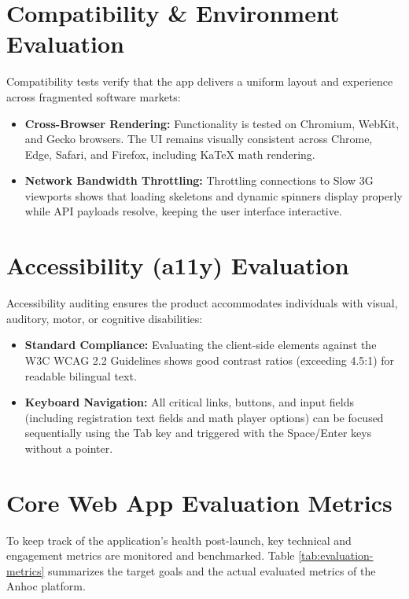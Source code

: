 \section{Compatibility \& Environment Evaluation}

Compatibility tests verify that the app delivers a uniform layout and experience across fragmented software markets:
\begin{itemize}
  \item \textbf{Cross-Browser Rendering:} Functionality is tested on Chromium, WebKit, and Gecko browsers. The UI remains visually consistent across Chrome, Edge, Safari, and Firefox, including KaTeX math rendering.
  \item \textbf{Network Bandwidth Throttling:} Throttling connections to Slow 3G viewports shows that loading skeletons and dynamic spinners display properly while API payloads resolve, keeping the user interface interactive.
\end{itemize}

\section{Accessibility (a11y) Evaluation}

Accessibility auditing ensures the product accommodates individuals with visual, auditory, motor, or cognitive disabilities:
\begin{itemize}
  \item \textbf{Standard Compliance:} Evaluating the client-side elements against the W3C WCAG 2.2 Guidelines shows good contrast ratios (exceeding 4.5:1) for readable bilingual text.
  \item \textbf{Keyboard Navigation:} All critical links, buttons, and input fields (including registration text fields and math player options) can be focused sequentially using the Tab key and triggered with the Space/Enter keys without a pointer.
\end{itemize}

\section{Core Web App Evaluation Metrics}

To keep track of the application's health post-launch, key technical and engagement metrics are monitored and benchmarked. Table \ref{tab:evaluation-metrics} summarizes the target goals and the actual evaluated metrics of the Anhoc platform.

